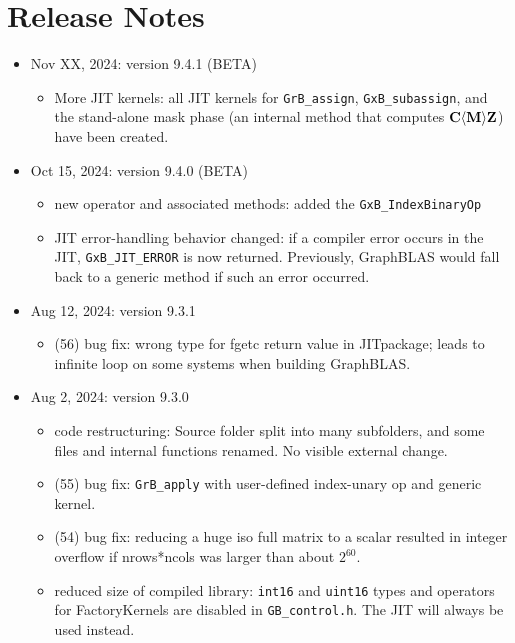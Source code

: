 \documentclass[12pt]{article}
\begin{document}
\section{Release Notes}

\begin{itemize}

\item Nov XX, 2024: version 9.4.1 (BETA)    %

    \begin{itemize}
    \item More JIT kernels: all JIT kernels for \verb'GrB_assign',
    \verb'GxB_subassign', and the stand-alone mask phase (an internal method
    that computes $\bf C \langle M \rangle Z$) have been created.
    \end{itemize}

\item Oct 15, 2024: version 9.4.0 (BETA)

    \begin{itemize}
    \item new operator and associated methods:
        added the \verb'GxB_IndexBinaryOp'
    \item JIT error-handling behavior changed:  if a compiler error occurs in
        the JIT, \verb'GxB_JIT_ERROR' is now returned.  Previously, GraphBLAS
        would fall back to a generic method if such an error occurred.
    \end{itemize}

\item Aug 12, 2024: version 9.3.1

    \begin{itemize}
    \item (56) bug fix:  wrong type for fgetc return value in JITpackage; leads
        to infinite loop on some systems when building GraphBLAS.
    \end{itemize}

\item Aug 2, 2024: version 9.3.0

    \begin{itemize}
    \item code restructuring:  Source folder split into many subfolders, and
        some files and internal functions renamed.  No visible external change.
    \item (55) bug fix: \verb'GrB_apply' with user-defined index-unary op and
        generic kernel.
    \item (54) bug fix: reducing a huge iso full matrix to a scalar resulted in
        integer overflow if nrows*ncols was larger than about $2^{60}$.
    \item reduced size of compiled library: \verb'int16' and \verb'uint16'
        types and operators for FactoryKernels are disabled in
        \verb'GB_control.h'.  The JIT will always be used instead.
    \end{itemize}


\end{itemize}
\end{document}
